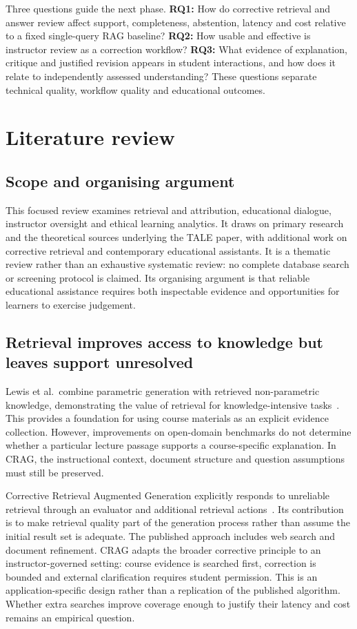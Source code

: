 \documentclass[11pt,a4paper]{article}
\begin{document}
Three questions guide the next phase. \textbf{RQ1:} How do corrective retrieval and answer review affect support, completeness, abstention, latency and cost relative to a fixed single-query RAG baseline? \textbf{RQ2:} How usable and effective is instructor review as a correction workflow? \textbf{RQ3:} What evidence of explanation, critique and justified revision appears in student interactions, and how does it relate to independently assessed understanding? These questions separate technical quality, workflow quality and educational outcomes.

\section{Literature review}
\subsection{Scope and organising argument}
This focused review examines retrieval and attribution, educational dialogue, instructor oversight and ethical learning analytics. It draws on primary research and the theoretical sources underlying the TALE paper, with additional work on corrective retrieval and contemporary educational assistants. It is a thematic review rather than an exhaustive systematic review: no complete database search or screening protocol is claimed. Its organising argument is that reliable educational assistance requires both inspectable evidence and opportunities for learners to exercise judgement.

\subsection{Retrieval improves access to knowledge but leaves support unresolved}
Lewis et al.\ combine parametric generation with retrieved non-parametric knowledge, demonstrating the value of retrieval for knowledge-intensive tasks~\cite{lewis}. This provides a foundation for using course materials as an explicit evidence collection. However, improvements on open-domain benchmarks do not determine whether a particular lecture passage supports a course-specific explanation. In CRAG, the instructional context, document structure and question assumptions must still be preserved.

Corrective Retrieval Augmented Generation explicitly responds to unreliable retrieval through an evaluator and additional retrieval actions~\cite{yan}. Its contribution is to make retrieval quality part of the generation process rather than assume the initial result set is adequate. The published approach includes web search and document refinement. CRAG adapts the broader corrective principle to an instructor-governed setting: course evidence is searched first, correction is bounded and external clarification requires student permission. This is an application-specific design rather than a replication of the published algorithm. Whether extra searches improve coverage enough to justify their latency and cost remains an empirical question.
\end{document}
